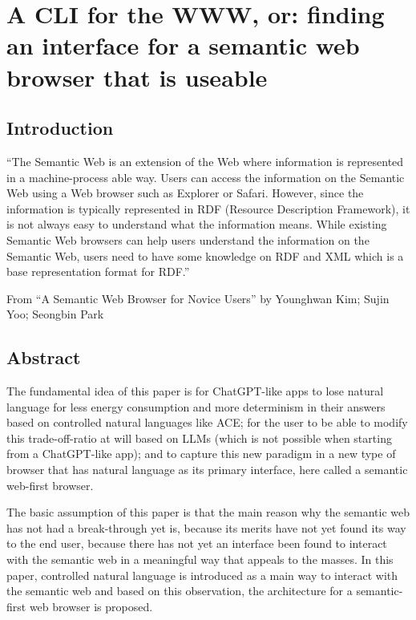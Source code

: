 \documentclass[12pt,a4paper]{article}
\begin{document}
\section{A CLI for the WWW, or: finding an interface for a semantic web browser that is useable}

\subsection{Introduction}

``The Semantic Web is an extension of the Web where information is represented in a machine-process able way. Users can access the information on the Semantic Web using a Web browser such as Explorer or Safari. However, since the information is typically represented in RDF (Resource Description Framework), it is not always easy to understand what the information means. While existing Semantic Web browsers can help users understand the information on the Semantic Web, users need to have some knowledge on RDF and XML which is a base representation format for RDF.''

From ``A Semantic Web Browser for Novice Users'' by Younghwan Kim; Sujin Yoo; Seongbin Park

\subsection{Abstract}

The fundamental idea of this paper is for ChatGPT-like apps to lose natural language for less energy consumption and more determinism in their answers based on controlled natural languages like ACE; for the user to be able to modify this trade-off-ratio at will based on LLMs (which is not possible when starting from a ChatGPT-like app); and to capture this new paradigm in a new type of browser that has natural language as its primary interface, here called a semantic web-first browser.

The basic assumption of this paper is that the main reason why the semantic web has not had a break-through yet is, because its merits have not yet found its way to the end user, because there has not yet an interface been found to interact with the semantic web in a meaningful way that appeals to the masses. In this paper, controlled natural language is introduced as a main way to interact with the semantic web and based on this observation, the architecture for a semantic-first web browser is proposed.
\end{document}
